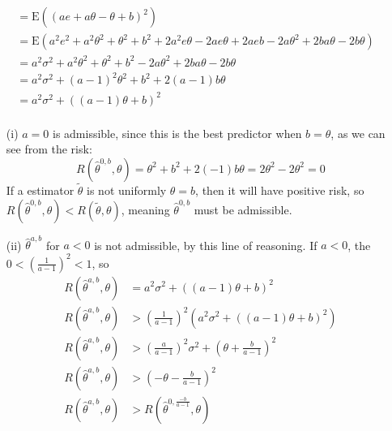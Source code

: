 \documentclass[11pt]{article}
\newcommand{\E}{\mathrm{E}}
\theoremstyle{definition}
\begin{document}
\begin{itemize}
\begin{itemize}
\begin{align*}
                                               &= \E((ae + a\theta -\theta + b)^2) \\
                                               &= \E(a^2e^2+a^2\theta^2 +\theta^2 +b^2 + 2a^2e\theta - 2ae\theta + 2aeb - 2a\theta^2 + 2ba\theta - 2b\theta) \\
                                               &= a^2\sigma^2+a^2\theta^2 +\theta^2 +b^2 - 2a\theta^2 + 2ba\theta - 2b\theta \\
                                               &= a^2\sigma^2+(a-1)^2\theta^2 +b^2 + 2(a-1)b\theta  \\
                                               &= a^2\sigma^2+((a-1)\theta +b)^2  \\
                \end{align*}
                \begin{itemize}
                    \item[(i)]
                        \(a=0\) is admissible, since this is the best predictor when \(b=\theta\), as we can see from the risk:
                        \[R(\hat\theta^{0,b},\theta) = \theta^2 +b^2 + 2(-1)b\theta = 2\theta^2 -2\theta^2 = 0 \] 
                        If a estimator $\tilde\theta$ is not uniformly $\theta=b$, then it will have positive risk, so \(R(\hat\theta^{0,b},\theta)< R(\tilde\theta,\theta)\), meaning $\hat\theta^{0,b}$ must be admissible. 
                    \item[(ii)]
                        \(\hat\theta^{a,b}\) for \(a<0\) is not admissible, by this line of reasoning. If \(a<0\), the \(0<\left(\frac{1}{a-1}\right)^2<1\), so                      
                        \begin{align*}
                            R(\hat\theta^{a,b},\theta) &= a^2\sigma^2+((a-1)\theta +b)^2  \\
                            R(\hat\theta^{a,b},\theta) &>\left(\frac{1}{a-1}\right)^2\left(a^2\sigma^2+\left((a-1)\theta +b\right)^2\right)  \\
                            R(\hat\theta^{a,b},\theta) &>\left(\frac{a}{a-1}\right)^2\sigma^2+\left(\theta +\frac{b}{a-1}\right)^2  \\
                            R(\hat\theta^{a,b},\theta) &>\left(-\theta -\frac{b}{a-1}\right)^2  \\
                            R(\hat\theta^{a,b},\theta) &>R(\hat\theta^{0,\frac{-b}{a-1}},\theta)  \\
                        \end{align*}

\end{itemize}
\end{itemize}
\end{itemize}
\end{document}

